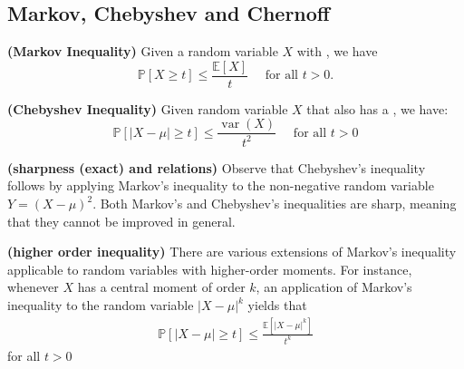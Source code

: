 \documentclass{article}
\newcommand{\bfs}[1]{\textbf{({#1})}}
\begin{document}
\subsection{Markov, Chebyshev and Chernoff}\label{ssec:markov_chernoff}
\begin{thma}{\bfs{Markov Inequality}}
Given a  random variable $X$ with , we have
$$
\mathbb{P}[X \geq t] \leq \frac{\mathbb{E}[X]}{t} \quad \text { for all } t>0 .
$$
\end{thma}
\begin{thma}{\bfs{Chebyshev Inequality}}
Given random variable $X$ that also has a , we have:
$$
\mathbb{P}[|X-\mu| \geq t] \leq \frac{\operatorname{var}(X)}{t^{2}} \quad \text { for all } t>0
$$
\end{thma}
\begin{rema}{\bfs{sharpness (exact) and relations}}
Observe that Chebyshev's inequality follows by applying Markov's inequality to the non-negative random variable $Y=(X-\mu)^{2}.$ Both Markov's and Chebyshev's inequalities are sharp, meaning that they cannot be improved in general.
\end{rema}
\begin{rema}{\bfs{higher order inequality}}
There are various extensions of Markov's inequality applicable to random variables with higher-order moments. For instance, whenever $X$ has a central moment of order $k$, an application of Markov's inequality to the random variable $|X-\mu|^{k}$ yields that
\begin{align}
\mathbb{P}[|X-\mu| \geq t] \leq \frac{\mathbb{E}\left[|X-\mu|^{k}\right]}{t^{k}}\label{basic:eq1}
\end{align}
for all $t>0$
\end{rema}
\end{document}
